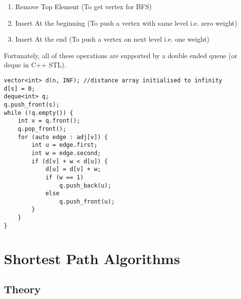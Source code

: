\documentclass[twoside,12pt,a4paper,english]{book}
\theoremstyle{definition}
\theoremstyle{problemstyle}
\theoremstyle{problemstyle}
\theoremstyle{problemstyle}
\begin{document}
\begin{enumerate}
    \item Remove Top Element (To get vertex for BFS)
    \item Insert At the beginning (To push a vertex with same level i.e. zero weight)
    \item Insert At the end (To push a vertex on next level i.e. one weight)
\end{enumerate}
Fortunately, all of these operations are supported by a double ended queue (or deque in C++ STL).
\newpage
\begin{lstlisting}
vector<int> d(n, INF); //distance array initialised to infinity
d[s] = 0;
deque<int> q;
q.push_front(s);
while (!q.empty()) {
    int v = q.front();
    q.pop_front();
    for (auto edge : adj[v]) {
        int u = edge.first;
        int w = edge.second;
        if (d[v] + w < d[u]) {
            d[u] = d[v] + w;
            if (w == 1)
                q.push_back(u);
            else
                q.push_front(u);
        }
    }
}
\end{lstlisting}

\part{Shortest Path Algorithms}

\chapter{Theory}
\end{document}

